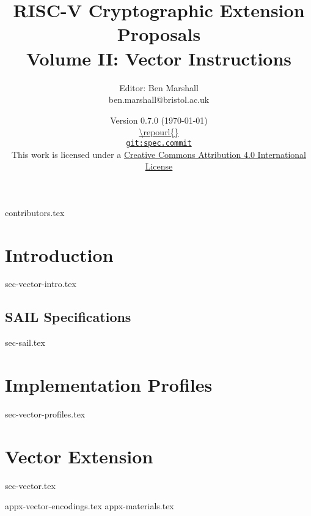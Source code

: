 \documentclass[11pt]{article}
\title{RISC-V Cryptographic Extension Proposals\\Volume II: Vector Instructions}
\author{Editor: Ben Marshall\\ben.marshall@bristol.ac.uk}
\date{Version $0.7.0$ (\today) \\
\medskip
\url{\repourl{}} \\
\href{\repourl{}}{
{\small \tt git:{spec.commit}}} \\
\bigskip
{\small
This work is licensed under a
\href{http://creativecommons.org/licenses/by/4.0/}{Creative Commons Attribution 4.0 International License}
}
}
\begin{document}

\maketitle

{contributors.tex}

\tableofcontents




\newpage
\section{Introduction}
\label{sec:intro}
{sec-vector-intro.tex}

\subsection{SAIL Specifications}
\label{sec:sail}
{sec-sail.tex}

\newpage
\section{Implementation Profiles}
\label{sec:profiles}
{sec-vector-profiles.tex}

\newpage
\section{Vector Extension}
\label{sec:vector}
{sec-vector.tex}


\newpage
\printbibliography


%
%

\newpage
\begin{appendices}
\label{sec:appendix}
{appx-vector-encodings.tex}
{appx-materials.tex}
\end{appendices}

\end{document}
